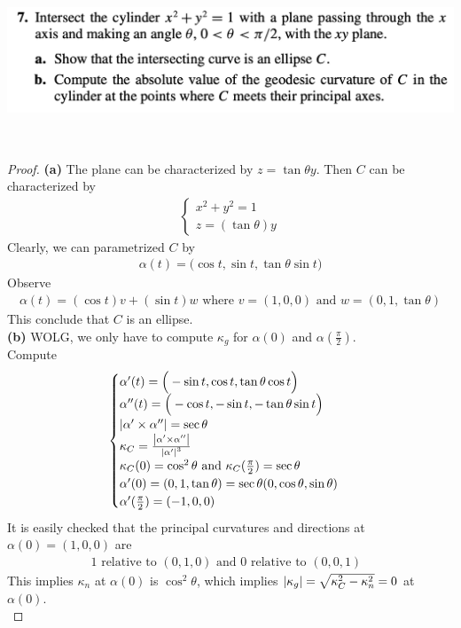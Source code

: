 \documentclass{report}
\begin{document}
\begin{question}{}{}
\includegraphics[height=5cm,width=18cm]{hw72}
\end{question}
\begin{proof}
\textbf{(a)} The plane can be characterized by $z=\tan \theta y$. Then $C$ can be characterized by 
\begin{align*}
\begin{cases}
  x^2+y^2=1\\
  z=(\tan \theta) y
\end{cases}
\end{align*}
Clearly, we can parametrized $C$ by 
\begin{align*}
\alpha (t)=\Big(\cos t, \sin t, \tan \theta  \sin t \Big)
\end{align*}
Observe 
\begin{align*}
\alpha (t)= (\cos t) v+ (\sin t) w\text{ where }v=(1,0,0)\text{ and }w=(0,1,\tan \theta )
\end{align*}
This conclude that $C$ is an ellipse.\\

\textbf{(b)} WOLG, we only have to compute $\kappa_g$ for $\alpha (0)$ and $\alpha (\frac{\pi}{2})$.\\

Compute 
\begin{align*}
\begin{cases}
  \alpha '(t)=\Big(-\sin t, \cos t , \tan \theta \cos t \Big)\\
  \alpha ''(t)=\Big(-\cos t, -\sin t, -\tan \theta \sin t \Big)\\ 
  \left|\alpha ' \times \alpha ''\right|=\sec \theta \\
  \kappa_C = \frac{\left|\alpha '\times \alpha ''\right|}{\left|\alpha '\right|^3}\\
  \kappa_C(0)=\cos^2 \theta \text{ and }\kappa_C(\frac{\pi}{2})=\sec \theta\\
  \alpha '(0)=(0,1,\tan \theta)=\sec \theta (0, \cos \theta , \sin \theta)\\
  \alpha '(\frac{\pi}{2})=(-1,0,0)
\end{cases}
\end{align*}
It is easily checked that the principal curvatures and directions at $\alpha (0)=(1,0,0)$ are 
\begin{align*}
1\text{ relative to $(0,1,0)$ and }0\text{ relative to $(0,0,1)$ }
\end{align*}
This implies $\kappa_n$ at $\alpha (0)$ is $\cos^2 \theta$, which implies $\left|\kappa_g\right|=\sqrt{\kappa_C^2 - \kappa_n^2}=0$ at $\alpha (0)$.\\


\end{proof}
\end{document}
